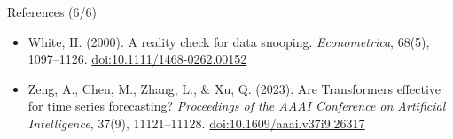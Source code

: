 \begin{frame}{References (6/6)}
\begin{itemize}
    \item White, H. (2000). A reality check for data snooping. \textit{Econometrica}, 68(5), 1097--1126. \href{https://doi.org/10.1111/1468-0262.00152}{doi:10.1111/1468-0262.00152}
    \item Zeng, A., Chen, M., Zhang, L., \& Xu, Q. (2023). Are Transformers effective for time series forecasting? \textit{Proceedings of the AAAI Conference on Artificial Intelligence}, 37(9), 11121--11128. \href{https://doi.org/10.1609/aaai.v37i9.26317}{doi:10.1609/aaai.v37i9.26317}
\end{itemize}
\end{frame}


